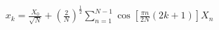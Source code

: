 \documentclass[preview]{standalone}
\begin{document}
\begin{align*}
x_k = \frac{X_0}{\sqrt{N}} + \left(\frac{2}{N}\right)^{\frac{1}{2}} \sum_{n=1}^{N-1} \cos \left[\frac{\pi n}{2N}(2k+1)\right]X_n
\end{align*}
\end{document}
